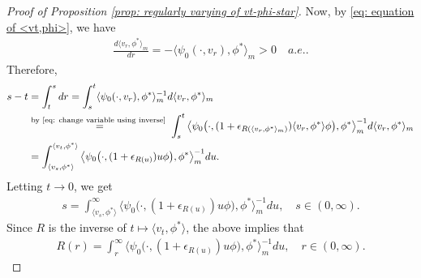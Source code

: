 \documentclass[UTF8]{pkuthss}
\theoremstyle{plain}
\theoremstyle{definition}
\numberwithin{equation}{section}
\begin{document}
\begin{proof}[Proof of Proposition \ref{prop: regularly varying of vt-phi-star}]
	Now, by \eqref{eq: equation of <vt,phi>}, we have
\begin{align}
	\frac{d \langle v_r, \phi^* \rangle_m}{dr}
	= - \langle \psi_0(\cdot ,v_r) ,\phi^*\rangle_m
	> 0
	\quad a.e..
\end{align}
	Therefore,
\begin{align}
	s-t
	& = \int_t^s dr
	= \int_s^t \langle \psi_0(\cdot ,v_r), \phi^*\rangle _m^{-1} d\langle v_r ,\phi^* \rangle_m
	\\&\overset{\text{by \eqref{eq: change variable using inverse} }}{=} \int_s^t \big\langle \psi_0\big( \cdot ,(1+ \epsilon_{R(\langle v_r,\phi^* \rangle_m)})\langle v_r,\phi^*\rangle \phi \big), \phi^* \big\rangle _m^{-1} d\langle v_r ,\phi^* \rangle_m
	\\&= \int_{\langle v_s,\phi^*\rangle}^{\langle v_t, \phi^* \rangle} \big\langle \psi_0 \big( \cdot ,( 1 + \epsilon_{R(u)} ) u \phi \big), \phi^* \big\rangle_m^{-1} du.
\end{align}
	Letting $t\to 0$, we get
\begin{align}
	s
	= \int_{\langle v_s,\phi^*\rangle}^\infty \big\langle \psi_0 \big(\cdot ,( 1 + \epsilon_{R(u)} ) u \phi \big), \phi^* \big\rangle_m^{-1} du,
	\quad s\in (0,\infty).
\end{align}
	Since $R$ is the inverse of $t\mapsto \langle v_t,\phi^*\rangle$, the above implies that
\begin{align}\label{eq: integral equation for R}
	R(r)
	= \int_r^\infty \big\langle \psi_0 \big(\cdot ,( 1 + \epsilon_{R(u)} ) u \phi \big), \phi^* \big\rangle_m^{-1} du,
	\quad r\in (0,\infty).
\end{align}
	

\end{proof}
\end{document}
